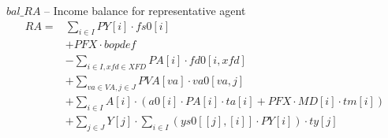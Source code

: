 \documentclass{amsart}
\begin{document}
$bal\_RA$ -- Income balance for representative agent
\begin{align*}
RA =& \sum_{i\in I}PY[i]\cdot fs0[i] \\
&+ PFX\cdot bopdef\\
&- \sum_{i\in I,xfd\in XFD}PA[i]\cdot fd0[i,xfd] \\
&+  \sum_{va\in VA,j\in J}PVA[va]\cdot va0[va,j]\\
&+ \sum_{i\in I}A[i]\cdot (a0[i]\cdot PA[i]\cdot ta[i] + PFX\cdot MD[i]\cdot tm[i]) \\
&+ \sum_{j\in J}Y[j]\cdot \sum_{i\in I}(ys0[[j],[i]]\cdot PY[i])\cdot ty[j]
\end{align*}
\end{document}
